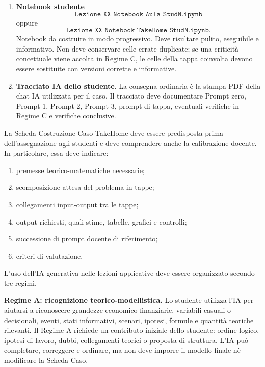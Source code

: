 \documentclass[12pt,a4paper]{article}%
\newcommand{\1}{\mathbf{1}}
\begin{document}
\begin{enumerate}
\item \textbf{Notebook studente}
\[
\texttt{Lezione\_XX\_Notebook\_Aula\_StudN.ipynb}
\]
\noindent oppure
\[
\texttt{Lezione\_XX\_Notebook\_TakeHome\_StudN.ipynb}.
\]
Notebook da costruire in modo progressivo. Deve risultare pulito,
eseguibile e informativo. Non deve conservare celle errate duplicate; se una
criticità concettuale viene accolta in Regime C, le celle della tappa
coinvolta devono essere sostituite con versioni corrette e informative.

\item \textbf{Tracciato IA dello studente}.
La consegna ordinaria \`{e} la stampa PDF della chat IA utilizzata per il
caso. Il tracciato deve documentare Prompt zero, Prompt 1, Prompt 2,
Prompt 3, prompt di tappa, eventuali verifiche in Regime C e verifiche
conclusive.
\end{enumerate}

La Scheda Costruzione Caso TakeHome deve essere predisposta
prima dell'assegnazione agli studenti e deve comprendere anche la calibrazione
docente. In particolare, essa deve indicare:
\begin{enumerate}
\item premesse teorico-matematiche necessarie;

\item scomposizione attesa del problema in tappe;

\item collegamenti input-output tra le tappe;

\item output richiesti, quali stime, tabelle, grafici e controlli;

\item successione di prompt docente di riferimento;


\item criteri di valutazione.
\end{enumerate}

L'uso dell'IA generativa nelle lezioni applicative deve essere organizzato
secondo tre regimi.

\medskip
\noindent
\textbf{Regime A: ricognizione teorico-modellistica.}
Lo studente utilizza l'IA per aiutarsi a riconoscere grandezze
economico-finanziarie, variabili casuali o decisionali, eventi, stati
informativi, scenari, ipotesi, formule e quantit\`{a} teoriche rilevanti.
Il Regime A richiede un contributo iniziale dello studente: ordine logico,
ipotesi di lavoro, dubbi, collegamenti teorici o proposta di struttura.
L'IA pu\`{o} completare, correggere e ordinare, ma non deve imporre il
modello finale n\`{e} modificare la Scheda Caso.
\end{document}
